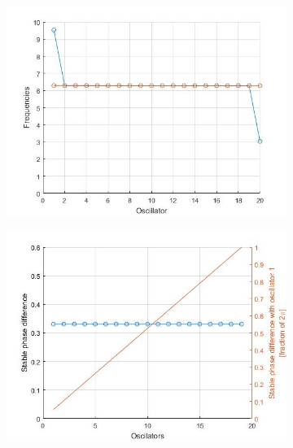 \documentclass[a4paper]{scrartcl}
\begin{document}
\begin{figure}[!b]
	\centering
	\begin{subfigure}[b]{0.49\textwidth}
		\centering
		\includegraphics[width=\textwidth]{results/6.b/compSP_DP_CPFreq.jpg}
		\caption{}\label{3a}
	\end{subfigure}
	\centering
	\begin{subfigure}[b]{0.49\textwidth}
		\centering
		\includegraphics[width=\textwidth]{results/6.b/compSP_DP_CPPhase.jpg}
		\caption{}\label{3b}
	\end{subfigure}
	\centering
	\begin{subfigure}[b]{0.49\textwidth}
		\centering

\end{subfigure}
\end{figure}
\end{document}

